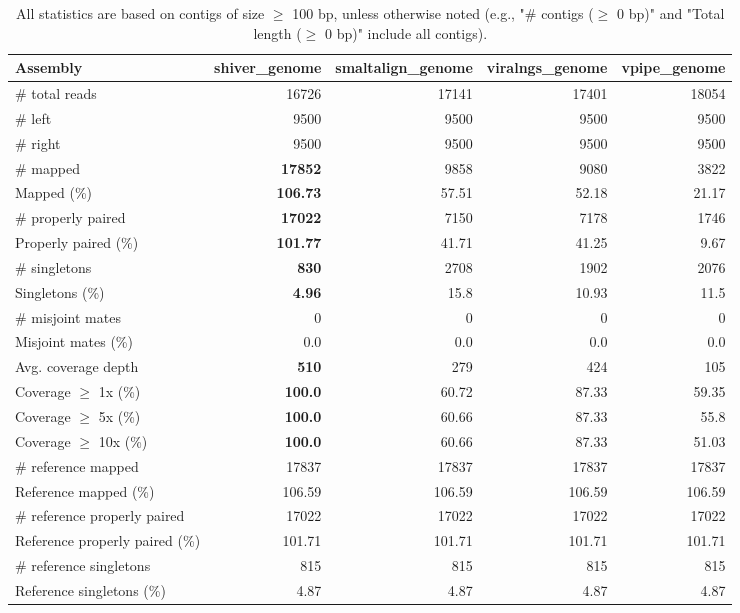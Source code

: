 \documentclass[12pt,a4paper]{article}
\begin{document}
\begin{table}[ht]
\begin{center}
\caption{All statistics are based on contigs of size $\geq$ 100 bp, unless otherwise noted (e.g., "\# contigs ($\geq$ 0 bp)" and "Total length ($\geq$ 0 bp)" include all contigs).}
\begin{tabular}{|l*{4}{|r}|}
\hline
Assembly & shiver\_genome & smaltalign\_genome & viralngs\_genome & vpipe\_genome \\ \hline
\# total reads & 16726 & 17141 & 17401 & 18054 \\ \hline
\# left & 9500 & 9500 & 9500 & 9500 \\ \hline
\# right & 9500 & 9500 & 9500 & 9500 \\ \hline
\# mapped & {\bf 17852} & 9858 & 9080 & 3822 \\ \hline
Mapped (\%) & {\bf 106.73} & 57.51 & 52.18 & 21.17 \\ \hline
\# properly paired & {\bf 17022} & 7150 & 7178 & 1746 \\ \hline
Properly paired (\%) & {\bf 101.77} & 41.71 & 41.25 & 9.67 \\ \hline
\# singletons & {\bf 830} & 2708 & 1902 & 2076 \\ \hline
Singletons (\%) & {\bf 4.96} & 15.8 & 10.93 & 11.5 \\ \hline
\# misjoint mates & 0 & 0 & 0 & 0 \\ \hline
Misjoint mates (\%) & 0.0 & 0.0 & 0.0 & 0.0 \\ \hline
Avg. coverage depth & {\bf 510} & 279 & 424 & 105 \\ \hline
Coverage $\geq$ 1x (\%) & {\bf 100.0} & 60.72 & 87.33 & 59.35 \\ \hline
Coverage $\geq$ 5x (\%) & {\bf 100.0} & 60.66 & 87.33 & 55.8 \\ \hline
Coverage $\geq$ 10x (\%) & {\bf 100.0} & 60.66 & 87.33 & 51.03 \\ \hline
\# reference mapped & 17837 & 17837 & 17837 & 17837 \\ \hline
Reference mapped (\%) & 106.59 & 106.59 & 106.59 & 106.59 \\ \hline
\# reference properly paired & 17022 & 17022 & 17022 & 17022 \\ \hline
Reference properly paired (\%) & 101.71 & 101.71 & 101.71 & 101.71 \\ \hline
\# reference singletons & 815 & 815 & 815 & 815 \\ \hline
Reference singletons (\%) & 4.87 & 4.87 & 4.87 & 4.87 \\ \hline

\end{tabular}
\end{center}
\end{table}
\end{document}
